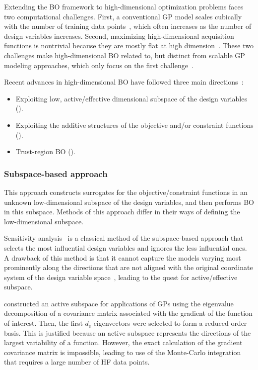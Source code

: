 \documentclass[journal ]{new-aiaa}
\begin{document}
	Extending the BO framework to high-dimensional optimization problems faces two computational challenges.
	First, a conventional GP model scales cubically with the number of training data points~\citep{Rasmussen2006}, which often increases as the number of design variables increases.
	Second, maximizing high-dimensional acquisition functions is nontrivial because they are mostly flat at high dimension~\citep{Rana2017}.
	These two challenges make high-dimensional BO related to, but distinct from scalable GP modeling approaches, which only focus on the first challenge~\citep{LiuH2020}. 
	
	Recent advances in high-dimensional BO have followed three main directions~\citep{Daulton2022MOBO}: 
	\begin{itemize}
		\item Exploiting low, active/effective dimensional subspace of the design variables ().
		
		\item Exploiting the additive structures of the objective and/or constraint functions ().
		
		\item Trust-region BO ().
	\end{itemize}
	
	\subsubsection{Subspace-based approach}\label{Sec621}
	
	This approach constructs surrogates for the objective/constraint functions in an unknown low-dimensional subspace of the design variables, and then performs BO in this subspace.
	Methods of this approach differ in their ways of defining the low-dimensional subspace.
	
	Sensitivity analysis~\citep{Spagnol2019} is a classical method of the subspace-based approach that selects the most influential design variables and ignores the less influential ones.
	A drawback of this method is that it cannot capture the models varying most prominently along the directions that are not aligned with the original coordinate system of the design variable space~\citep{Constantine2014}, leading to the quest for active/effective subspace.
	
	\citet{Constantine2014} constructed an active subspace for applications of GPs using the eigenvalue decomposition of a covariance matrix associated with the gradient of the function of interest.
	Then, the first $d_\text{e}$ eigenvectors were selected to form a reduced-order basis.
	This is justified because an active subspace represents the directions of the largest variability of a function.
	However, the exact calculation of the gradient covariance matrix is impossible, leading to use of the Monte-Carlo integration that requires a large number of HF data points.  
	
\end{document}
